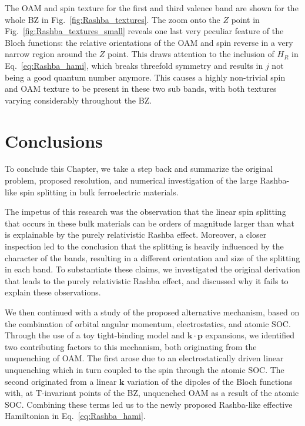 The \gls{OAM} and spin texture for the first and third valence band are shown for the whole \gls{BZ} in Fig.~\ref{fig:Rashba_textures}.
The zoom onto the $Z$ point in Fig.~\ref{fig:Rashba_textures_small} reveals one last very peculiar feature of the Bloch functions: the relative orientations of the \gls{OAM} and spin reverse in a very narrow region around the $Z$ point.
This draws attention to the inclusion of $H_R$ in Eq.~\eqref{eq:Rashba_hami}, which breaks threefold symmetry and results in $j$ not being a good quantum number anymore. This causes a highly non-trivial spin and \gls{OAM} texture to be present in these two sub bands, with both textures varying considerably throughout the \gls{BZ}. 
\section{Conclusions}
To conclude this Chapter, we take a step back and summarize the original problem, proposed resolution, and numerical investigation of the large Rashba-like spin splitting in bulk ferroelectric materials.
    
The impetus of this research was the observation that the linear spin splitting that occurs in these bulk materials can be orders of magnitude larger than what is explainable by the purely relativistic Rashba effect.
Moreover, a closer inspection led to the conclusion that the splitting is heavily influenced by the character of the bands, resulting in a different orientation and size of the splitting in each band.
To substantiate these claims, we investigated the original derivation that leads to the purely relativistic Rashba effect, and discussed why it fails to explain these observations.
    
We then continued with a study of the proposed alternative mechanism, based on the combination of orbital angular momentum, electrostatics, and atomic \gls{SOC}.
Through the use of a toy tight-binding model and $\bm k \cdot \bm p$ expansions, we identified two contributing factors to this mechanism, both originating from the unquenching of \gls{OAM}.
The first arose due to an electrostatically driven linear unquenching which in turn coupled to the spin through the atomic \gls{SOC}.
The second originated from a linear $\bm k$ variation of the dipoles of the Bloch functions with, at \gls{T}-invariant points of the \gls{BZ}, unquenched \gls{OAM} as a result of the atomic \gls{SOC}.
Combining these terms led us to the newly proposed Rashba-like effective Hamiltonian in Eq.~\eqref{eq:Rashba_hami}.
    
